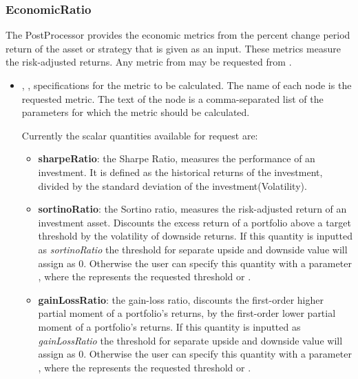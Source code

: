 \subsubsection{EconomicRatio}
\label{EconomicRatio}
The  PostProcessor provides the economic metrics from the percent change
period return of the asset or strategy that is given as an input. These metrics measure the risk-adjusted returns.
\nb Any metric from  may be requested from .
%

\begin{itemize}
  \item {}, ,
  specifications for the metric to be calculated. The name of each node is the requested metric.
  The text of the node is a comma-separated list of the parameters for which the metric should be calculated.

  Currently the scalar quantities available for request are:
  \begin{itemize}

  \item \textbf{sharpeRatio}: the Sharpe Ratio, measures the performance of an investment. It is defined as the  historical returns of the investment, divided by the standard deviation of the investment(Volatility).
  \item \textbf{sortinoRatio}: the Sortino ratio, measures the risk-adjusted return of an investment asset. Discounts the excess return of a portfolio above a target threshold by the volatility of downside returns. If this quantity is inputted as \textit{sortinoRatio} the threshold for separate upside and downside value will assign as $0$. Otherwise the user can specify this quantity with a parameter , where the  represents the requested threshold  or .

  \item \textbf{gainLossRatio}: the gain-loss ratio, discounts the first-order higher partial moment of a portfolio's returns, by the first-order lower partial moment of a portfolio's returns. If this quantity is inputted as \textit{gainLossRatio} the threshold for separate upside and downside value will assign as $0$. Otherwise the user can specify this quantity with a parameter , where the  represents the requested threshold  or .



\end{itemize}
\end{itemize}
